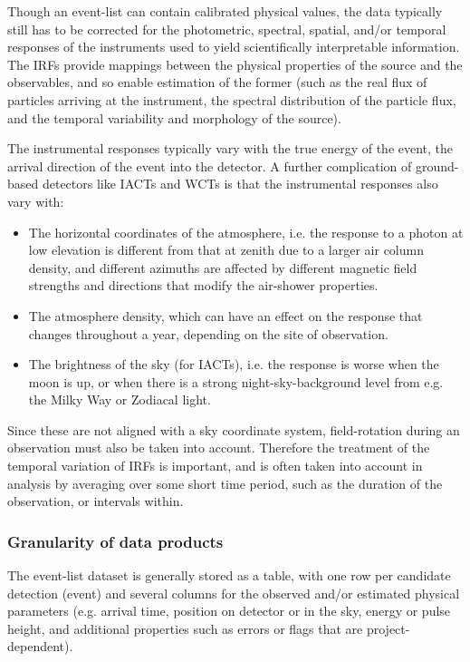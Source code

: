 \documentclass[11pt,a4paper]{ivoa}
\begin{document}
Though an event-list can contain calibrated physical values, the data typically still has to be corrected for the
photometric, spectral, spatial, and/or temporal responses of the instruments used to yield scientifically interpretable
information. The IRFs provide mappings between the physical properties of the source and the observables, and so enable
estimation of the former (such as the real flux of particles arriving at the instrument, the spectral distribution of
the particle flux, and the temporal variability and morphology of the source).

The instrumental responses typically vary with the true energy of the event, the arrival direction of the event into the
detector. A further complication of ground-based detectors like IACTs and WCTs is that the instrumental responses also vary with:
\begin{itemize}
  \item The horizontal coordinates of the atmosphere, i.e. the response to a photon at low elevation is different from that at zenith due to a larger air column density, and different azimuths are affected by different magnetic field strengths and directions that modify the air-shower properties.
  \item The atmosphere density, which can have an effect on the response that changes throughout a year, depending on the site of observation.
  \item The brightness of the sky (for IACTs), i.e. the response is worse when the moon is up, or when there is a strong night-sky-background level from e.g. the Milky Way or Zodiacal light.
\end{itemize}
Since these are not aligned with a sky coordinate system, field-rotation during an observation must also be taken into account.
Therefore the treatment of the temporal variation of IRFs is important, and is often taken into account in analysis by averaging over some short time period, such as the duration of the observation, or intervals within.

\subsubsection{Granularity of data products}

The event-list dataset is generally stored as a table, with one row per candidate detection (event) and several columns
for the observed and/or estimated physical parameters (e.g. arrival time, position on detector or in the sky, energy or
pulse height, and additional properties such as errors or flags that are project-dependent).
\end{document}
